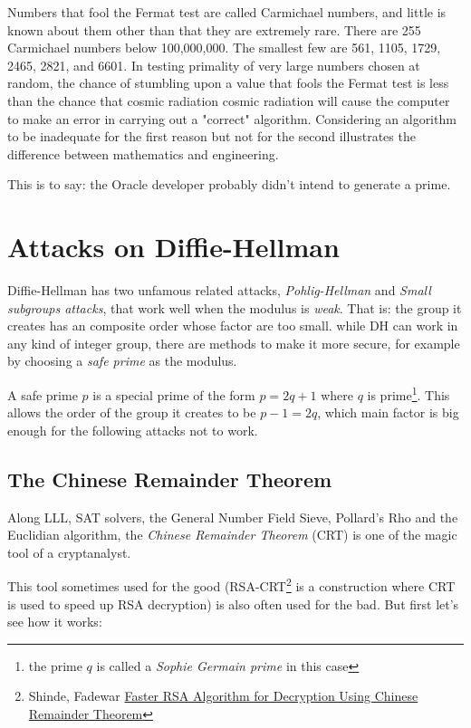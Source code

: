 \documentclass[a4paper,11pt]{article}
\begin{document}
\begin{displayquote}
Numbers that fool the Fermat test are called Carmichael numbers, and little is known about them other than that they are extremely rare. There are 255 Carmichael numbers below 100,000,000. The smallest few are 561, 1105, 1729, 2465, 2821, and 6601. In testing primality of very large numbers chosen at random, the chance of stumbling upon a value that fools the Fermat test is less than the chance that cosmic radiation cosmic radiation will cause the computer to make an error in carrying out a "correct" algorithm. Considering an algorithm to be inadequate for the first reason but not for the second illustrates the difference between mathematics and engineering.
\end{displayquote}

This is to say: the Oracle developer probably didn't intend to generate a prime.

\section{Attacks on Diffie-Hellman}

Diffie-Hellman has two unfamous related attacks, \emph{Pohlig-Hellman} and \emph{Small subgroups attacks}, that work well when the modulus is \emph{weak}. That is: the group it creates has an composite order whose factor are too small. while DH can work in any kind of integer group, there are methods to make it more secure, for example by choosing a \emph{safe prime} as the modulus.

A safe prime $p$ is a special prime of the form $p = 2q + 1$ where $q$ is prime\footnote{the prime $q$ is called a \emph{Sophie Germain prime} in this case}. This allows the order of the group it creates to be $p - 1 = 2q$, which main factor is big enough for the following attacks not to work.

\subsection{The Chinese Remainder Theorem}

Along LLL, SAT solvers, the General Number Field Sieve, Pollard's Rho and the Euclidian algorithm, the \emph{Chinese Remainder Theorem} (CRT) is one of the magic tool of a cryptanalyst.

This tool sometimes used for the good (RSA-CRT\footnote{ Shinde, Fadewar \href{http://www.techscience.com/doi/10.3970/icces.2008.005.255.pdf}{Faster RSA Algorithm for Decryption Using Chinese
Remainder Theorem}}\cite{fasterRSA} is a construction where CRT is used to speed up RSA decryption) is also often used for the bad. But first let's see how it works:
\end{document}
